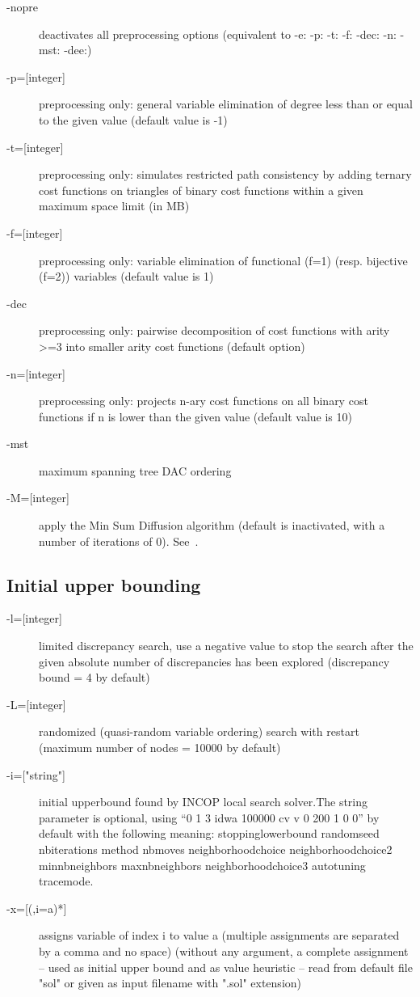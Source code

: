 \documentclass{article}
\begin{document}
\begin{description}
\item[{-nopre}] deactivates all preprocessing options (equivalent to -e:
  -p: -t: -f: -dec: -n: -mst: -dee:)
\item[{-p=[integer]}]preprocessing only: general variable elimination
  of degree less than or equal to the given value (default value is
  -1)
\item[{-t=[integer]}] preprocessing only: simulates restricted path
  consistency by adding ternary cost functions on triangles of binary
  cost functions within a given maximum space limit (in MB)
\item[{-f=[integer]}] preprocessing only: variable elimination of
  functional (f=1) (resp. bijective (f=2)) variables (default value is
  1)
\item[{-dec}] preprocessing only: pairwise decomposition of cost
  functions with arity >=3 into smaller arity cost functions (default
  option)
\item[{-n=[integer]}] preprocessing only: projects n-ary cost functions
  on all binary cost functions if n is lower than the given value
  (default value is 10)
\item[{-mst}] maximum spanning tree DAC ordering
\item[{-M=[integer]}]
  apply the Min Sum Diffusion algorithm (default is inactivated, with
  a number of iterations of 0). See~\cite{Cooper2010,Werner??}.
 \end{description}
 

\subsection{Initial upper bounding}

\begin{description}
\item[{-l=[integer]}] limited discrepancy search, use a negative value to stop the search after the given absolute number of discrepancies has been explored (discrepancy bound = 4 by default)
\item[{-L=[integer]}] randomized (quasi-random variable ordering) search with restart (maximum number of nodes = 10000 by default)
\item[{-i=["string"]}] initial upperbound found by INCOP local search
  solver.The string parameter is optional, using ``0 1 3 idwa 100000
  cv v 0 200 1 0 0'' by default with the following meaning:
  stoppinglowerbound randomseed nbiterations method nbmoves
  neighborhoodchoice neighborhoodchoice2 minnbneighbors maxnbneighbors
  neighborhoodchoice3 autotuning tracemode.
\item[{-x=[(,i=a)*]}] assigns variable of index i to value a (multiple
  assignments are separated by a comma and no space) (without any
  argument, a complete assignment -- used as initial upper bound and
  as value heuristic -- read from default file "sol" or given as input
  filename with ".sol" extension)
\end{description}
\end{document}
